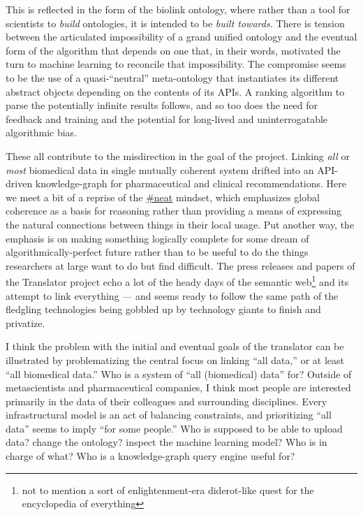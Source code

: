 \documentclass[10pt]{article}
\begin{document}
\begin{multicols}{2}
This is reflected in the form of the biolink ontology, where rather than
a tool for scientists to \emph{build} ontologies, it is intended to be
\emph{built towards.} There is tension between the articulated
impossibility of a grand unified ontology and the eventual form of the
algorithm that depends on one that, in their words, motivated the turn
to machine learning to reconcile that impossibility. The compromise
seems to be the use of a quasi-``neutral'' meta-ontology that
instantiates its different abstract objects depending on the contents of
its APIs. A ranking algorithm to parse the potentially infinite results
follows, and so too does the need for feedback and training and the
potential for long-lived and uninterrogatable algorithmic bias.

These all contribute to the misdirection in the goal of the project.
Linking \emph{all} or \emph{most} biomedical data in single mutually
coherent system drifted into an API-driven knowledge-graph for
pharmaceutical and clinical recommendations. Here we meet a bit of a
reprise of the \protect\hyperlink{neatness-vs-scruffiness}{\#neat}
mindset, which emphasizes global coherence as a basis for reasoning
rather than providing a means of expressing the natural connections
between things in their local usage. Put another way, the emphasis is on
making something logically complete for some dream of
algorithmically-perfect future rather than to be useful to do the things
researchers at large want to do but find difficult. The press releases
and papers of the Translator project echo a lot of the heady days of the
semantic web\footnote{not to mention a sort of enlightenment-era
  diderot-like quest for the encyclopedia of everything} and its attempt
to link everything --- and seems ready to follow the same path of the
fledgling technologies being gobbled up by technology giants to finish
and privatize.

I think the problem with the initial and eventual goals of the
translator can be illustrated by problematizing the central focus on
linking ``all data,'' or at least ``all biomedical data.'' Who is a
system of ``all (biomedical) data'' for? Outside of metascientists and
pharmaceutical companies, I think most people are interested primarily
in the data of their colleagues and surrounding disciplines. Every
infrastructural model is an act of balancing constraints, and
prioritizing ``all data'' seems to imply ``for some people.'' Who is
supposed to be able to upload data? change the ontology? inspect the
machine learning model? Who is in charge of what? Who is a
knowledge-graph query engine useful for?


\end{multicols}
\end{document}
